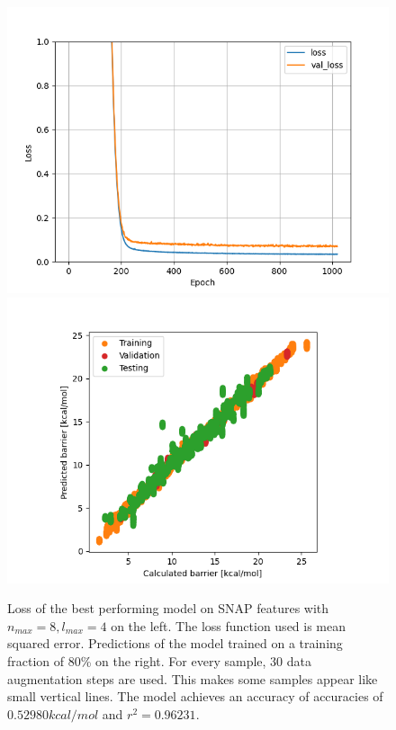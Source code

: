 \begin{figure}[!htb]
    \includegraphics[width=1.0\textwidth]{figures/regression/snap/loss_8-4.png}
  \endminipage\hfill
  \includegraphics[width=1.0\textwidth]{figures/regression/snap/scatter_8-4.png}
  \endminipage\hfill  
  \caption[Best performing model on SNAP features]{
    Loss of the best performing model on SNAP features with  $n_{max}=8, l_{max}=4$ on the left. 
    The loss function used is mean squared error.
    Predictions of the model trained on a training fraction of 80\% on the right. 
    For every sample, 30 data augmentation steps are used. This makes some samples appear like small vertical lines.
    The model achieves an accuracy of accuracies of $0.52980 kcal/mol$ and
    $r^2 = 0.96231$.
  }
  \label{fig:snap_roation}

\end{figure}


